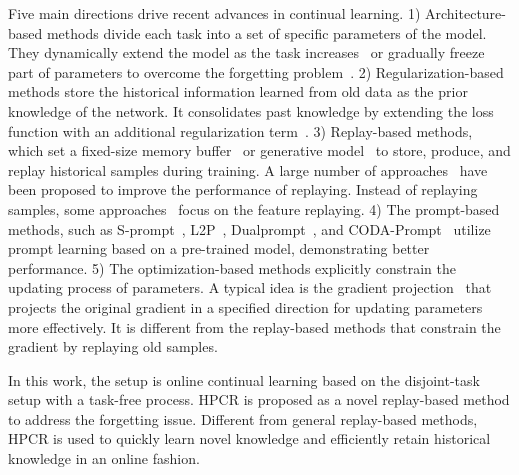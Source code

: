 Five main directions drive recent advances in continual learning. 1) {Architecture-based methods} divide each task into a set of specific parameters of the model. They dynamically extend the model as the task increases~\cite{gao2022efficient} or gradually freeze part of parameters to overcome the forgetting problem~\cite{miao2021continual}. 2) {Regularization-based methods} store the historical information learned from old data as the prior knowledge of the network. It consolidates past knowledge by extending the loss function with an additional regularization term~\cite{kirkpatrick2017overcoming,dhar2019learning}. 3) {Replay-based methods}, which set a fixed-size memory buffer~\cite{buzzega2021rethinking} or generative model~\cite{su2019generative,dedeoglu2023continual,park2020convolutional} to store, produce, and replay historical samples during training. A large number of approaches~\cite{cha2021co2l,chaudhry2021using} have been proposed to improve the performance of replaying. Instead of replaying samples, some approaches~\cite{lao2021two,ho2023prototype} focus on the feature replaying. 4) The prompt-based methods, such as S-prompt~\cite{wang2022s}, L2P~\cite{wang2022learning}, Dualprompt~\cite{wang2022dualprompt}, and CODA-Prompt~\cite{smith2023coda} utilize prompt learning based on a pre-trained model, demonstrating better performance. 5) The optimization-based methods explicitly constrain the updating process of parameters. A typical idea is the gradient projection~\cite{wang2021training,kao2021natural,deng2021flattening} that projects the original gradient in a specified direction for updating parameters more effectively. It is different from the replay-based methods that constrain the gradient by replaying old samples.

In this work, the setup is online continual learning based on the disjoint-task setup with a task-free process. HPCR is proposed as a novel replay-based method to address the forgetting issue. Different from general replay-based methods, HPCR is used to quickly learn novel knowledge and efficiently retain historical knowledge in an online fashion.


